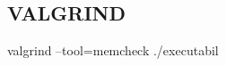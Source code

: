 \documentclass{refcard.cs.pub.ro}
\begin{document}
\begin{multicols*}{3}
\vspace*{0.3cm}

\section{VALGRIND}

valgrind --tool=memcheck ./executabil

\end{multicols*}
\end{document}
